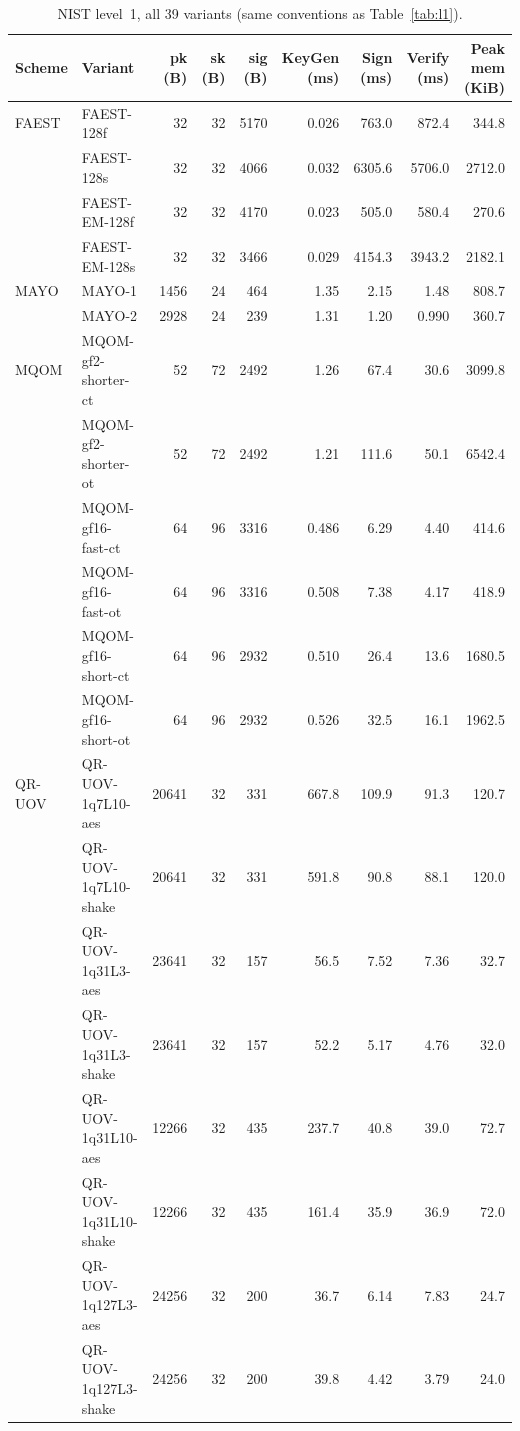 \begin{table}[t]
\centering
\caption{NIST level~1, all 39 variants (same conventions as Table~\ref{tab:l1}).}
\label{tab:l1full}
\small
\begin{tabular}{llrrrrrrr}
\toprule
Scheme & Variant & pk (B) & sk (B) & sig (B) & KeyGen (ms) & Sign (ms) & Verify (ms) & Peak mem (KiB) \\
\midrule
FAEST & FAEST-128f & 32 & 32 & 5170 & 0.026 & 763.0 & 872.4 & 344.8 \\
 & FAEST-128s & 32 & 32 & 4066 & 0.032 & 6305.6 & 5706.0 & 2712.0 \\
 & FAEST-EM-128f & 32 & 32 & 4170 & 0.023 & 505.0 & 580.4 & 270.6 \\
 & FAEST-EM-128s & 32 & 32 & 3466 & 0.029 & 4154.3 & 3943.2 & 2182.1 \\
\midrule
MAYO & MAYO-1 & 1456 & 24 & 464 & 1.35 & 2.15 & 1.48 & 808.7 \\
 & MAYO-2 & 2928 & 24 & 239 & 1.31 & 1.20 & 0.990 & 360.7 \\
\midrule
MQOM & MQOM-gf2-shorter-ct & 52 & 72 & 2492 & 1.26 & 67.4 & 30.6 & 3099.8 \\
 & MQOM-gf2-shorter-ot & 52 & 72 & 2492 & 1.21 & 111.6 & 50.1 & 6542.4 \\
 & MQOM-gf16-fast-ct & 64 & 96 & 3316 & 0.486 & 6.29 & 4.40 & 414.6 \\
 & MQOM-gf16-fast-ot & 64 & 96 & 3316 & 0.508 & 7.38 & 4.17 & 418.9 \\
 & MQOM-gf16-short-ct & 64 & 96 & 2932 & 0.510 & 26.4 & 13.6 & 1680.5 \\
 & MQOM-gf16-short-ot & 64 & 96 & 2932 & 0.526 & 32.5 & 16.1 & 1962.5 \\
\midrule
QR-UOV & QR-UOV-1q7L10-aes & 20641 & 32 & 331 & 667.8 & 109.9 & 91.3 & 120.7 \\
 & QR-UOV-1q7L10-shake & 20641 & 32 & 331 & 591.8 & 90.8 & 88.1 & 120.0 \\
 & QR-UOV-1q31L3-aes & 23641 & 32 & 157 & 56.5 & 7.52 & 7.36 & 32.7 \\
 & QR-UOV-1q31L3-shake & 23641 & 32 & 157 & 52.2 & 5.17 & 4.76 & 32.0 \\
 & QR-UOV-1q31L10-aes & 12266 & 32 & 435 & 237.7 & 40.8 & 39.0 & 72.7 \\
 & QR-UOV-1q31L10-shake & 12266 & 32 & 435 & 161.4 & 35.9 & 36.9 & 72.0 \\
 & QR-UOV-1q127L3-aes & 24256 & 32 & 200 & 36.7 & 6.14 & 7.83 & 24.7 \\
 & QR-UOV-1q127L3-shake & 24256 & 32 & 200 & 39.8 & 4.42 & 3.79 & 24.0 \\

\end{tabular}
\end{table}
